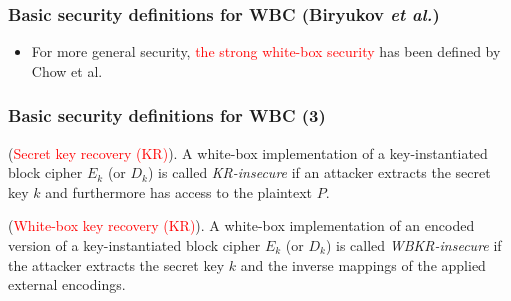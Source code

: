 \documentclass{beamer}
\begin{document}
\frame
{
\frametitle{Basic security definitions for WBC (Biryukov \textit{et al.})}
\begin{itemize}
\item For more general security, \textcolor{red}{the strong white-box security} has been defined by Chow et al.
\end{itemize}

\begin{center}
\end{center}
}

\frame
{
\frametitle{Basic security definitions for WBC (3)}
\begin{definition}(\textcolor{red}{Secret key recovery (KR)}). A white-box implementation of a key-instantiated block cipher $E_{k}$ (or $D_{k}$) is called \textit{KR-insecure} if an attacker extracts the secret key $k$ and furthermore has access to the plaintext $P$.
\end{definition}

\begin{definition}
(\textcolor{red}{White-box key recovery (KR)}). A white-box implementation of an encoded version of a key-instantiated block cipher $E_{k}$ (or $D_{k}$) is called \textit{WBKR-insecure} if the attacker extracts the secret key $k$ and the inverse mappings of the applied external encodings.
\end{definition}
}
\end{document}
